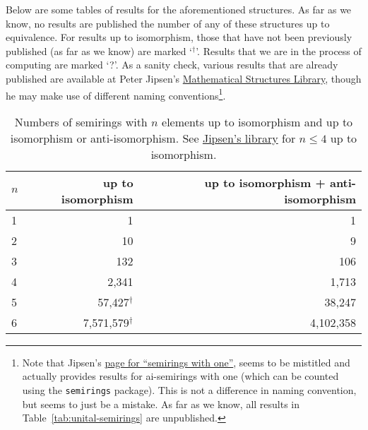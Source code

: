 \documentclass{article}
\theoremstyle{definition}
\theoremstyle{plain}
\begin{document}
Below are some tables of results for the aforementioned structures. As far as we know, no results are published the number of any of these structures up to equivalence. For results up to isomorphism, those that have not been previously published (as far as we know) are marked `$^\dagger$'. Results that we are in the process of computing are marked `?'. As a sanity check, various results that are already published are available at Peter Jipsen's \href{https://math.chapman.edu/~jipsen/structures/doku.php?id=start}{Mathematical Structures Library}, though he may make use of different naming conventions\footnote{Note that Jipsen's \href{https://math.chapman.edu/~jipsen/structures/doku.php?id=semirings_with_identity\#finite_members}{page for ``semirings with one''}, seems to be mistitled and actually provides results for ai-semirings with one (which can be counted using the \texttt{semirings} package). This is not a difference in naming convention, but seems to just be a mistake. As far as we know, all results in Table~\ref{tab:unital-semirings} are unpublished.}.
\begin{table}[ht]
    \centering
    \begin{tabular}{l|r|r}
      \toprule
      $n$ & up to isomorphism & up to isomorphism + anti-isomorphism \\
      \midrule
      1 & 1         & 1         \\
      2 & 10        & 9         \\
      3 & 132       & 106       \\
      4 & 2,341     & 1,713     \\
      5 & 57,427$^\dagger$    & 38,247    \\
      6 & 7,571,579$^\dagger$  & 4,102,358 \\
    \end{tabular}
    \caption{Numbers of semirings with $n$ elements up to isomorphism and up
    to isomorphism or anti-isomorphism. See \href{https://math.chapman.edu/~jipsen/structures/doku.php?id=semirings\#finite_members}{Jipsen's library} for \(n\leq4\) up to isomorphism.}
    \label{tab:semirings}
\end{table}
\end{document}
